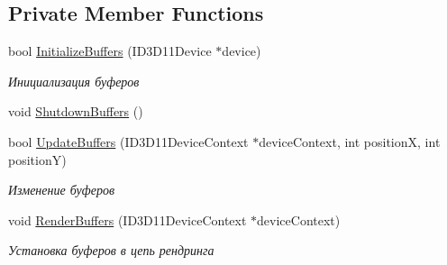 \subsection*{Private Member Functions}
\begin{DoxyCompactItemize}
\item 
bool \hyperlink{class_bitmap_class_a664110a255531e1dd980ebb85fc6d3ca}{Initialize\+Buffers} (I\+D3\+D11\+Device $\ast$device)
\begin{DoxyCompactList}\small\item\em Инициализация буферов \end{DoxyCompactList}\item 
void \hyperlink{class_bitmap_class_a9c3f2964ac428afbb0f448262a9d7489}{Shutdown\+Buffers} ()
\item 
bool \hyperlink{class_bitmap_class_a8bc5dbca5283dd7c62a9a1d4e8ac064e}{Update\+Buffers} (I\+D3\+D11\+Device\+Context $\ast$device\+Context, int positionX, int positionY)
\begin{DoxyCompactList}\small\item\em Изменение буферов \end{DoxyCompactList}\item 
void \hyperlink{class_bitmap_class_aeb68e813d145f03f6c4681036d8ed2e0}{Render\+Buffers} (I\+D3\+D11\+Device\+Context $\ast$device\+Context)
\begin{DoxyCompactList}\small\item\em Установка буферов в цепь рендринга \end{DoxyCompactList}\end{DoxyCompactItemize}
